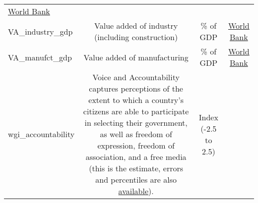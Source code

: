 \documentclass[]{article}
\begin{document}
\begin{longtable}[]{@{}lccc@{}}
\begin{minipage}[t]{0.15\columnwidth}
\href{https://data.worldbank.org/indicator/SL.UEM.NEET.ZS}{World
Bank}\strut
\end{minipage}\tabularnewline
\begin{minipage}[t]{0.14\columnwidth}\raggedright\strut
VA\_industry\_gdp\strut
\end{minipage} & \begin{minipage}[t]{0.36\columnwidth}\centering\strut
Value added of industry (including construction)\strut
\end{minipage} & \begin{minipage}[t]{0.24\columnwidth}\centering\strut
\% of GDP\strut
\end{minipage} & \begin{minipage}[t]{0.15\columnwidth}\centering\strut
\href{https://data.worldbank.org/indicator/NV.IND.TOTL.ZS}{World
Bank}\strut
\end{minipage}\tabularnewline
\begin{minipage}[t]{0.14\columnwidth}\raggedright\strut
VA\_manufct\_gdp\strut
\end{minipage} & \begin{minipage}[t]{0.36\columnwidth}\centering\strut
Value added of manufacturing\strut
\end{minipage} & \begin{minipage}[t]{0.24\columnwidth}\centering\strut
\% of GDP\strut
\end{minipage} & \begin{minipage}[t]{0.15\columnwidth}\centering\strut
\href{https://data.worldbank.org/indicator/NV.IND.MANF.ZS}{World
Bank}\strut
\end{minipage}\tabularnewline
\begin{minipage}[t]{0.14\columnwidth}\raggedright\strut
wgi\_accountability\strut
\end{minipage} & \begin{minipage}[t]{0.36\columnwidth}\centering\strut
Voice and Accountability captures perceptions of the extent to which a
country's citizens are able to participate in selecting their
government, as well as freedom of expression, freedom of association,
and a free media (this is the estimate, errors and percentiles are also
\href{https://info.worldbank.org/governance/wgi/\#home}{available}).\strut
\end{minipage} & \begin{minipage}[t]{0.24\columnwidth}\centering\strut
Index (-2.5 to 2.5)\strut
\end{minipage} & \begin{minipage}[t]{0.15\columnwidth}\centering\strut

\end{minipage}
\end{longtable}
\end{document}
